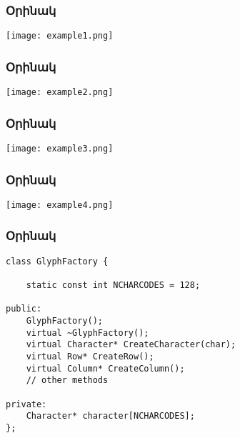 \documentclass{beamer}
\begin{document}
\begin{frame}\frametitle{Օրինակ}
\begin{center}
    \texttt{[image: example1.png]}
\end{center}
\end{frame}

\begin{frame}\frametitle{Օրինակ}
\begin{center}
    \texttt{[image: example2.png]}
\end{center}
\end{frame}

\begin{frame}\frametitle{Օրինակ}
\begin{center}
    \texttt{[image: example3.png]}
\end{center}
\end{frame}

\begin{frame}\frametitle{Օրինակ}
\begin{center}
    \texttt{[image: example4.png]}
\end{center}
\end{frame}

\begin{frame}[fragile]\frametitle{Օրինակ}
\begin{english}
\begin{verbatim}
class GlyphFactory {

    static const int NCHARCODES = 128;

public:
    GlyphFactory();
    virtual ~GlyphFactory();
    virtual Character* CreateCharacter(char);
    virtual Row* CreateRow();
    virtual Column* CreateColumn();
    // other methods

private:
    Character* character[NCHARCODES];
};
\end{verbatim}
\end{english}
\end{frame}
\end{document}
